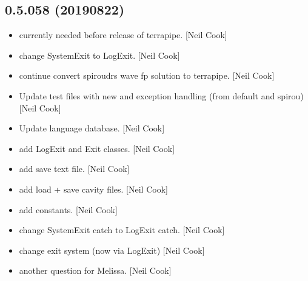 \documentclass[a4paper,10pt,english]{report}
\begin{document}
\subsection{0.5.058 (2019\sphinxhyphen{}08\sphinxhyphen{}22)}
\label{\detokenize{misc/changelog:id103}}\begin{itemize}
\item {} 
 \sphinxhyphen{} currently needed before release of terrapipe. {[}Neil
Cook{]}

\item {} 
 \sphinxhyphen{} change SystemExit to LogExit.
{[}Neil Cook{]}

\item {} 
 \sphinxhyphen{} continue convert spiroudrs wave fp solution to
terrapipe. {[}Neil Cook{]}

\item {} 
Update test files with new  and exception handling (from
default and spirou) {[}Neil Cook{]}

\item {} 
Update language database. {[}Neil Cook{]}

\item {} 
 \sphinxhyphen{} add LogExit and Exit classes. {[}Neil Cook{]}

\item {} 
 \sphinxhyphen{} add save text file. {[}Neil Cook{]}

\item {} 
 \sphinxhyphen{} add load + save cavity files. {[}Neil Cook{]}

\item {} 
 \sphinxhyphen{} add  constants. {[}Neil Cook{]}

\item {} 
 \sphinxhyphen{} change SystemExit catch to LogExit catch.
{[}Neil Cook{]}

\item {} 
 \sphinxhyphen{} change exit system (now via LogExit) {[}Neil
Cook{]}

\item {} 
 \sphinxhyphen{} another question for Melissa. {[}Neil Cook{]}

\end{itemize}
\end{document}

